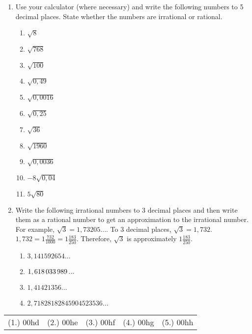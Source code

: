 \begin{enumerate}[noitemsep, label=\textbf{\arabic*}. ]
        \label{m38349*uid32}\item Use your calculator (where necessary) and write the following numbers to 5 decimal places. State whether the numbers are irrational or rational.
\label{m38349*id326080}\begin{enumerate}[noitemsep, label=\textbf{\alph*}. ] 
            \label{m38349*uid33}\item $\sqrt{8}$\label{m38349*uid34}\item $\sqrt{768}$\label{m38349*uid35}\item $\sqrt{100}$\label{m38349*uid36}\item $\sqrt{0,49}$\label{m38349*uid37}\item $\sqrt{0,0016}$\label{m38349*uid38}\item $\sqrt{0,25}$\label{m38349*uid39}\item $\sqrt{36}$\label{m38349*uid40}\item $\sqrt{1960}$\label{m38349*uid41}\item $\sqrt{0,0036}$\label{m38349*uid42}\item $-8\sqrt{0,04}$\label{m38349*uid43}\item $5\sqrt{80}$\end{enumerate}
        \label{m38349*uid44}\item Write the following irrational numbers to 3 decimal places and then write them as a rational number to get an approximation to the irrational number. For example, $\sqrt{3}=1,73205...$. To 3 decimal places, $\sqrt{3}=1,732$. $1,732=1\frac{732}{1000}=1\frac{183}{250}$. Therefore, $\sqrt{3}$ is approximately $1\frac{183}{250}$.
\label{m38349*id326443}\begin{enumerate}[noitemsep, label=\textbf{\alph*}. ] 
            \label{m38349*uid45}\item $3,141592654...$\label{m38349*uid46}\item $1,618\phantom{\rule{0.166667em}{0ex}}033\phantom{\rule{0.166667em}{0ex}}989\phantom{\rule{0.166667em}{0ex}}...$\label{m38349*uid47}\item $1,41421356...$\label{m38349*uid48}\item $2,71828182845904523536...$\end{enumerate}
        \end{enumerate}
  \label{m38349**end}
\practiceinfo
\par 
 \par \begin{tabular}[h]{ccccc}
 (1.) 00hd&  (2.) 00he&  (3.) 00hf&  (4.) 00hg&  (5.) 00hh& \end{tabular}
